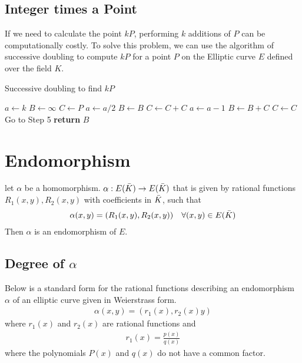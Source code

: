 \subsection{Integer times a Point}
If we need to calculate the point $kP$, performing $k$ additions of $P$ can be computationally costly. To solve this problem, we can use the algorithm of successive doubling to compute $kP$ for a point $P$ on the Elliptic curve $E$ defined over the field $K$.

\begin{algorithm}
\caption{Successive doubling to find $kP$}\label{kp_algo}
\begin{algorithmic}[1]
\State $a\gets k$
\State $B\gets \infty$
\State $C\gets P$
\State $a\gets a/2$
\State $B\gets B$
\State $C\gets C+C$
\Else
\State $a\gets a-1$
\State $B\gets B + C$
\State $C\gets C$
\EndIf 
{}
\State Go to Step 5
\EndIf 
\State \textbf{return} $B$
\EndProcedure
\end{algorithmic}
\end{algorithm}

\section{Endomorphism}
\begin{definition}
    let $\alpha$ be a homomorphism. $\alpha : E(\Bar{K}) \rightarrow E(\Bar{K})$ that is given by rational functions $R_1(x,y), R_2(x,y)$ with coefficients in $\Bar{K}$, such that
    \begin{align*}
        \alpha(x,y) = (R_1(x,y), R_2(x,y)) \quad \forall (x,y) \in E(\Bar{K})
    \end{align*}
    Then $\alpha$ is an endomorphism of $E$.
\end{definition}

\subsection{Degree of $\alpha$}
Below is a standard form for the rational functions describing an endomorphism $\alpha$ of an elliptic curve given in Weierstrass form.
\begin{align*}
    \alpha(x,y) = (r_1(x), r_2(x)y) 
\end{align*}
where $r_1(x)$ and $r_2(x)$ are rational functions and
\begin{align*}
    r_1(x) = \frac{p(x)}{q(x)}
\end{align*}
where the polynomials $P(x)$ and $q(x)$ do not have a common factor.

